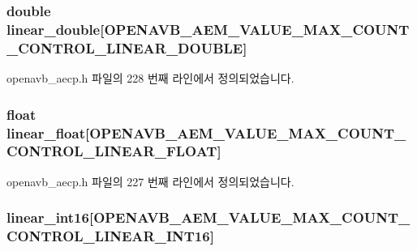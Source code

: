 \subsubsection[{\texorpdfstring{linear\+\_\+double}{linear_double}}]{\setlength{\rightskip}{0pt plus 5cm}double linear\+\_\+double\mbox{[}{\bf O\+P\+E\+N\+A\+V\+B\+\_\+\+A\+E\+M\+\_\+\+V\+A\+L\+U\+E\+\_\+\+M\+A\+X\+\_\+\+C\+O\+U\+N\+T\+\_\+\+C\+O\+N\+T\+R\+O\+L\+\_\+\+L\+I\+N\+E\+A\+R\+\_\+\+D\+O\+U\+B\+LE}\mbox{]}}\hypertarget{structopenavb__aecp__commandresponse__data__set__control__t_a4ac1f60ad606687e4dd294549ff9db69}{}\label{structopenavb__aecp__commandresponse__data__set__control__t_a4ac1f60ad606687e4dd294549ff9db69}


openavb\+\_\+aecp.\+h 파일의 228 번째 라인에서 정의되었습니다.

\subsubsection[{\texorpdfstring{linear\+\_\+float}{linear_float}}]{\setlength{\rightskip}{0pt plus 5cm}float linear\+\_\+float\mbox{[}{\bf O\+P\+E\+N\+A\+V\+B\+\_\+\+A\+E\+M\+\_\+\+V\+A\+L\+U\+E\+\_\+\+M\+A\+X\+\_\+\+C\+O\+U\+N\+T\+\_\+\+C\+O\+N\+T\+R\+O\+L\+\_\+\+L\+I\+N\+E\+A\+R\+\_\+\+F\+L\+O\+AT}\mbox{]}}\hypertarget{structopenavb__aecp__commandresponse__data__set__control__t_a5a346af0ca505581807d6ed0ec84a85e}{}\label{structopenavb__aecp__commandresponse__data__set__control__t_a5a346af0ca505581807d6ed0ec84a85e}


openavb\+\_\+aecp.\+h 파일의 227 번째 라인에서 정의되었습니다.

\subsubsection[{\texorpdfstring{linear\+\_\+int16}{linear_int16}}]{ linear\+\_\+int16\mbox{[}{\bf O\+P\+E\+N\+A\+V\+B\+\_\+\+A\+E\+M\+\_\+\+V\+A\+L\+U\+E\+\_\+\+M\+A\+X\+\_\+\+C\+O\+U\+N\+T\+\_\+\+C\+O\+N\+T\+R\+O\+L\+\_\+\+L\+I\+N\+E\+A\+R\+\_\+\+I\+N\+T16}\mbox{]}}\hypertarget{structopenavb__aecp__commandresponse__data__set__control__t_a971e2e30fcd86963178d3445519eccf4}{}\label{structopenavb__aecp__commandresponse__data__set__control__t_a971e2e30fcd86963178d3445519eccf4}


